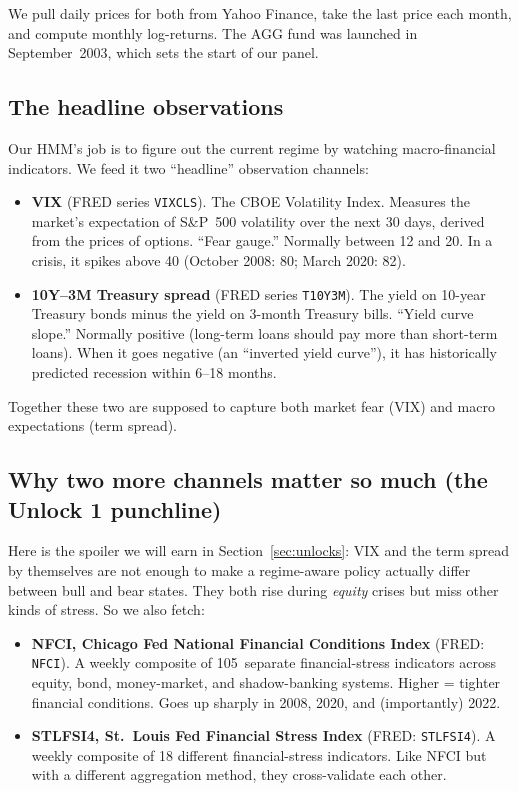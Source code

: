 \documentclass[11pt]{article}
\begin{document}
We pull daily prices for both from Yahoo Finance, take the last price each month, and compute monthly log-returns. The AGG fund was launched in September~2003, which sets the start of our panel.

\subsection{The headline observations}

Our HMM's job is to figure out the current regime by watching macro-financial indicators. We feed it two ``headline'' observation channels:

\begin{itemize}
  \item \textbf{VIX} (FRED series \texttt{VIXCLS}). The CBOE Volatility Index. Measures the market's expectation of S\&P~500 volatility over the next 30 days, derived from the prices of options. ``Fear gauge.'' Normally between 12 and 20. In a crisis, it spikes above 40 (October 2008: 80; March 2020: 82).
  \item \textbf{10Y--3M Treasury spread} (FRED series \texttt{T10Y3M}). The yield on 10-year Treasury bonds minus the yield on 3-month Treasury bills. ``Yield curve slope.'' Normally positive (long-term loans should pay more than short-term loans). When it goes negative (an ``inverted yield curve''), it has historically predicted recession within 6--18 months.
\end{itemize}

Together these two are supposed to capture both market fear (VIX) and macro expectations (term spread).

\subsection{Why two more channels matter so much (the Unlock 1 punchline)}

Here is the spoiler we will earn in Section~\ref{sec:unlocks}: VIX and the term spread by themselves are not enough to make a regime-aware policy actually differ between bull and bear states. They both rise during \emph{equity} crises but miss other kinds of stress. So we also fetch:

\begin{itemize}
  \item \textbf{NFCI, Chicago Fed National Financial Conditions Index} (FRED: \texttt{NFCI}). A weekly composite of 105~separate financial-stress indicators across equity, bond, money-market, and shadow-banking systems. Higher = tighter financial conditions. Goes up sharply in 2008, 2020, and (importantly) 2022.
  \item \textbf{STLFSI4, St.\ Louis Fed Financial Stress Index} (FRED: \texttt{STLFSI4}). A weekly composite of 18 different financial-stress indicators. Like NFCI but with a different aggregation method, they cross-validate each other.
\end{itemize}
\end{document}
